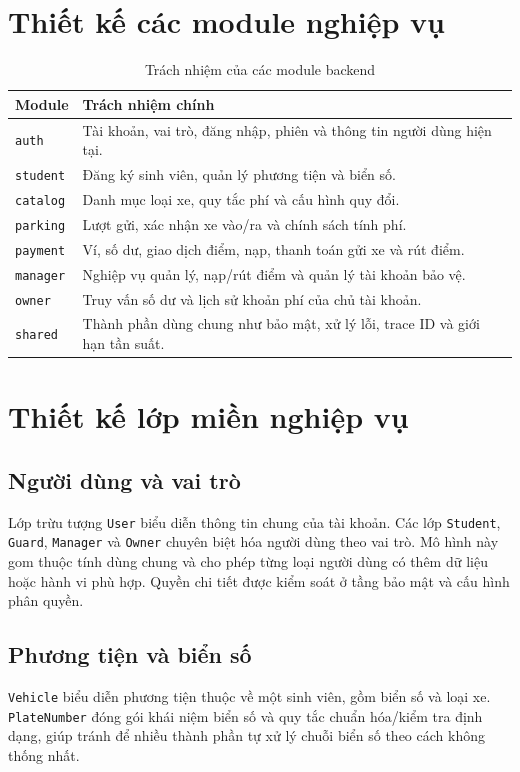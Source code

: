 \section{Thiết kế các module nghiệp vụ}

\begin{table}[htbp]
\centering
\caption{Trách nhiệm của các module backend}
\label{tab:backend-modules}
\begin{tabular}{|p{2.8cm}|p{10cm}|}
\hline
\textbf{Module} & \textbf{Trách nhiệm chính} \\ \hline
\texttt{auth} & Tài khoản, vai trò, đăng nhập, phiên và thông tin người dùng hiện tại. \\ \hline
\texttt{student} & Đăng ký sinh viên, quản lý phương tiện và biển số. \\ \hline
\texttt{catalog} & Danh mục loại xe, quy tắc phí và cấu hình quy đổi. \\ \hline
\texttt{parking} & Lượt gửi, xác nhận xe vào/ra và chính sách tính phí. \\ \hline
\texttt{payment} & Ví, số dư, giao dịch điểm, nạp, thanh toán gửi xe và rút điểm. \\ \hline
\texttt{manager} & Nghiệp vụ quản lý, nạp/rút điểm và quản lý tài khoản bảo vệ. \\ \hline
\texttt{owner} & Truy vấn số dư và lịch sử khoản phí của chủ tài khoản. \\ \hline
\texttt{shared} & Thành phần dùng chung như bảo mật, xử lý lỗi, trace ID và giới hạn tần suất. \\ \hline
\end{tabular}
\end{table}

\section{Thiết kế lớp miền nghiệp vụ}

\subsection{Người dùng và vai trò}
Lớp trừu tượng \texttt{User} biểu diễn thông tin chung của tài khoản. Các lớp \texttt{Student}, \texttt{Guard}, \texttt{Manager} và \texttt{Owner} chuyên biệt hóa người dùng theo vai trò. Mô hình này gom thuộc tính dùng chung và cho phép từng loại người dùng có thêm dữ liệu hoặc hành vi phù hợp. Quyền chi tiết được kiểm soát ở tầng bảo mật và cấu hình phân quyền.

\subsection{Phương tiện và biển số}
\texttt{Vehicle} biểu diễn phương tiện thuộc về một sinh viên, gồm biển số và loại xe. \texttt{PlateNumber} đóng gói khái niệm biển số và quy tắc chuẩn hóa/kiểm tra định dạng, giúp tránh để nhiều thành phần tự xử lý chuỗi biển số theo cách không thống nhất.

